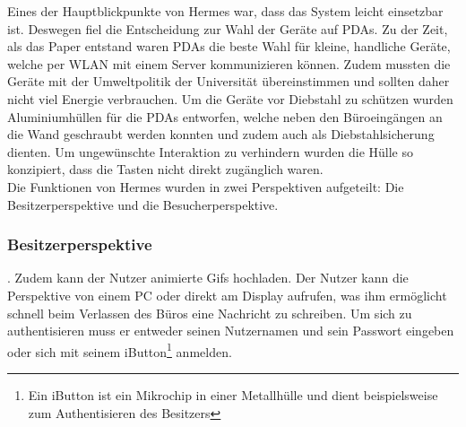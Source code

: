 Eines der Hauptblickpunkte von Hermes war, dass das System leicht einsetzbar ist. Deswegen fiel die Entscheidung zur Wahl der Geräte auf PDAs. Zu der Zeit, als das Paper entstand waren PDAs die beste Wahl für kleine, handliche Geräte, welche per WLAN mit einem Server kommunizieren können. Zudem mussten die Geräte mit der Umweltpolitik der Universität übereinstimmen und sollten daher nicht viel Energie verbrauchen.
Um die Geräte vor Diebstahl zu schützen wurden Aluminiumhüllen für die PDAs entworfen, welche neben den Büroeingängen an die Wand geschraubt werden konnten und zudem auch als Diebstahlsicherung dienten. Um ungewünschte Interaktion zu verhindern wurden die Hülle so konzipiert, dass die Tasten nicht direkt zugänglich waren.\\

Die Funktionen von Hermes wurden in zwei Perspektiven aufgeteilt: Die Besitzerperspektive und die Besucherperspektive.
\subsubsection{Besitzerperspektive}
\cite{cheverest:2003:paper}. Zudem kann der Nutzer animierte Gifs hochladen.
Der Nutzer kann die Perspektive von einem PC oder direkt am Display aufrufen, was ihm ermöglicht schnell beim Verlassen des Büros eine Nachricht zu schreiben. Um sich zu authentisieren muss er entweder seinen Nutzernamen und sein Passwort eingeben oder sich mit seinem iButton\footnote{Ein iButton ist ein Mikrochip in einer Metallhülle und dient beispielsweise zum Authentisieren des Besitzers\cite{iButton:website}} anmelden.
